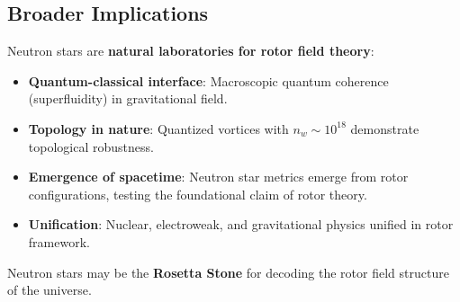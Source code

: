\documentclass[12pt,a4paper]{article}
\theoremstyle{definition}
\theoremstyle{remark}
\begin{document}
\subsection{Broader Implications}

Neutron stars are \textbf{natural laboratories for rotor field theory}:
\begin{itemize}
\item \textbf{Quantum-classical interface}: Macroscopic quantum coherence (superfluidity) in gravitational field.
\item \textbf{Topology in nature}: Quantized vortices with $n_w \sim 10^{18}$ demonstrate topological robustness.
\item \textbf{Emergence of spacetime}: Neutron star metrics emerge from rotor configurations, testing the foundational claim of rotor theory.
\item \textbf{Unification}: Nuclear, electroweak, and gravitational physics unified in rotor framework.
\end{itemize}

Neutron stars may be the \textbf{Rosetta Stone} for decoding the rotor field structure of the universe.
\end{document}
